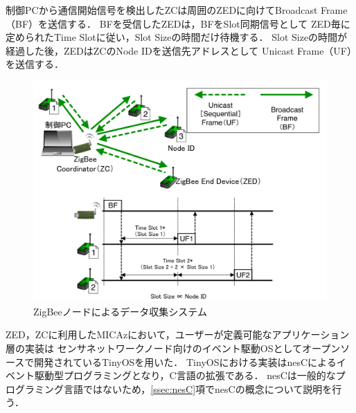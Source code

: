 \documentclass[12pt]{jreport}
\begin{document}
制御PCから通信開始信号を検出したZCは周囲のZEDに向けてBroadcast Frame（BF）を送信する．
BFを受信したZEDは，BFをSlot同期信号として
ZED毎に定められたTime Slotに従い，Slot Sizeの時間だけ待機する．
Slot Sizeの時間が経過した後，ZEDはZCのNode IDを送信先アドレスとして
Unicast Frame（UF）を送信する．

\begin{figure}[bt]
 \centering
 \includegraphics[width=\columnwidth]{figure/aacts_snw.pdf}
 \caption{ZigBeeノードによるデータ収集システム}
 \label{fig:aacts_snw}
\end{figure}

ZED，ZCに利用したMICAzにおいて，ユーザーが定義可能なアプリケーション層の実装は
センサネットワークノード向けのイベント駆動OSとしてオープンソースで開発されているTinyOSを用いた．
TinyOSにおける実装はnesCによるイベント駆動型プログラミングとなり，C言語の拡張である．
nesCは一般的なプログラミング言語ではないため，\ref{ssec:nesC}項でnesCの概念について説明を行う．
\end{document}
